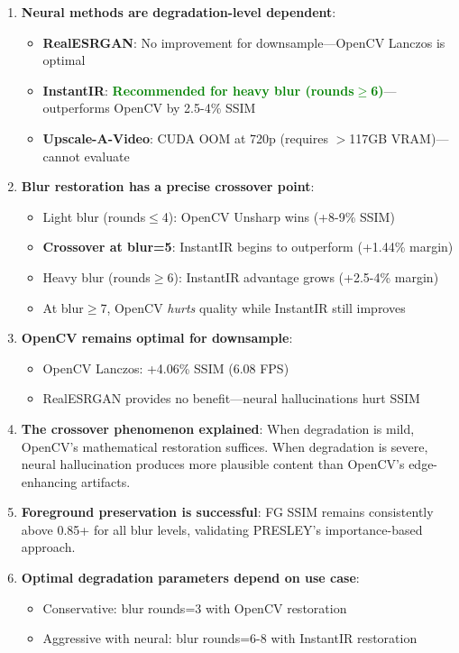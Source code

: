 \documentclass[11pt,a4paper]{article}
\begin{document}
\begin{enumerate}
    \item \textbf{Neural methods are degradation-level dependent}:
    \begin{itemize}
        \item \textbf{RealESRGAN}: No improvement for downsample---OpenCV Lanczos is optimal
        \item \textbf{InstantIR}: \textcolor{green}{\textbf{Recommended for heavy blur (rounds$\geq$6)}}---outperforms OpenCV by 2.5-4\% SSIM
        \item \textbf{Upscale-A-Video}: CUDA OOM at 720p (requires $>$117GB VRAM)---cannot evaluate
    \end{itemize}
    
    \item \textbf{Blur restoration has a precise crossover point}:
    \begin{itemize}
        \item Light blur (rounds$\leq$4): OpenCV Unsharp wins (+8-9\% SSIM)
        \item \textbf{Crossover at blur=5}: InstantIR begins to outperform (+1.44\% margin)
        \item Heavy blur (rounds$\geq$6): InstantIR advantage grows (+2.5-4\% margin)
        \item At blur$\geq$7, OpenCV \emph{hurts} quality while InstantIR still improves
    \end{itemize}
    
    \item \textbf{OpenCV remains optimal for downsample}:
    \begin{itemize}
        \item OpenCV Lanczos: +4.06\% SSIM (6.08 FPS)
        \item RealESRGAN provides no benefit---neural hallucinations hurt SSIM
    \end{itemize}
    
    \item \textbf{The crossover phenomenon explained}: When degradation is mild, OpenCV's mathematical restoration suffices. When degradation is severe, neural hallucination produces more plausible content than OpenCV's edge-enhancing artifacts.
    
    \item \textbf{Foreground preservation is successful}: FG SSIM remains consistently above 0.85+ for all blur levels, validating PRESLEY's importance-based approach.
    
    \item \textbf{Optimal degradation parameters depend on use case}:
    \begin{itemize}
        \item Conservative: blur rounds=3 with OpenCV restoration
        \item Aggressive with neural: blur rounds=6-8 with InstantIR restoration
    \end{itemize}
\end{enumerate}
\end{document}
